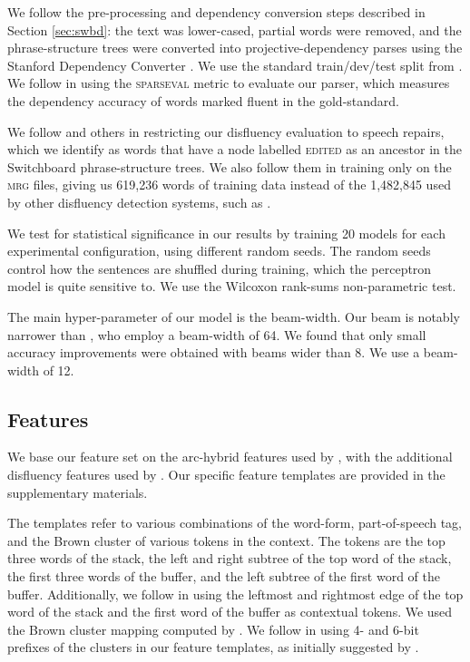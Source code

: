 \documentclass[11pt,letterpaper]{article}
\newcommand{\sparseval}{\textsc{sparseval}\xspace}
\begin{document}
We follow the pre-processing and dependency conversion steps described in
Section \ref{sec:swbd}: the text was lower-cased, partial words were removed,
and the phrase-structure trees were converted into projective-dependency parses
using the Stanford Dependency Converter \citep{stanford_deps}.
We use the standard train/dev/test split from \citet{Charniak01a}.
We follow \citet{honnibal:14} in using the \sparseval \citep{sparseval}
metric to evaluate our parser, which measures the dependency
accuracy of words marked fluent in the gold-standard.

We follow \citet{Johnson04a} and others in restricting our disfluency evaluation
to speech repairs, which we identify as words that have a node labelled \textsc{edited}
as an ancestor in the Switchboard phrase-structure trees.  We also follow them
in training only on the \textsc{mrg} files, giving us 619,236 words of training
data instead of the 1,482,845 used by other disfluency detection systems, such
as \citet{qian:13}.

We test for statistical significance in our results by training 20 models for
each experimental configuration, using different random seeds. The random seeds
control how the sentences are shuffled during training, which the perceptron
model is quite sensitive to.  We use the Wilcoxon rank-sums non-parametric test.

The main hyper-parameter of our model is the beam-width.
Our beam is notably narrower than \citet{honnibal:14}, who employ a beam-width
of 64. We found that
only small accuracy improvements were obtained with beams wider than 8.
We use a beam-width of 12.

\subsection{Features}

We base our feature set on the arc-hybrid features used by
\citet{goldberg:13},
with the additional disfluency features used by \citet{honnibal:14}.  Our
specific feature templates are provided in the supplementary materials.

The templates refer to various combinations of the word-form, part-of-speech tag,
and the Brown cluster \citep{brown:92} of various tokens
in the context.  The tokens are the top three words of the stack, the left and
right subtree of the top word of the stack, the first three words of the buffer,
and the left subtree of the first word of the buffer.  Additionally, we follow
\citet{honnibal:14} in using the leftmost and rightmost edge of the top word
of the stack and the first word of the buffer as contextual tokens.
We used the Brown cluster mapping computed by \citet{liang:05}.
We follow \citet{honnibal:14}
in using 4- and 6-bit prefixes of the clusters in our feature templates, as
initially suggested by \citet{koo:10}.
\end{document}
